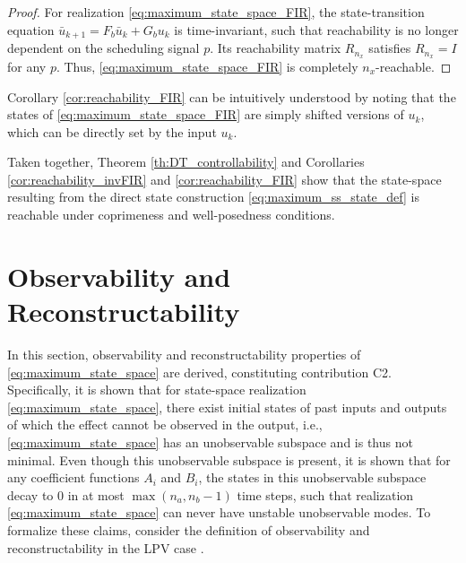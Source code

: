 \begin{proof}
    For realization \eqref{eq:maximum_state_space_FIR}, the state-transition equation $\bar{u}_{k+1} = F_b \bar{u}_k + G_b u_k$ is time-invariant, such that reachability is no longer dependent on the scheduling signal $p$. Its reachability matrix $R_{n_x}$ satisfies $R_{n_x} = I$ for any $p$. Thus, \eqref{eq:maximum_state_space_FIR} is completely $n_x$-reachable.
\end{proof}
Corollary \ref{cor:reachability_FIR} can be intuitively understood by noting that the states of \eqref{eq:maximum_state_space_FIR} are simply shifted versions of $u_k$, which can be directly set by the input $u_k$.  

Taken together, Theorem \ref{th:DT_controllability} and Corollaries \ref{cor:reachability_invFIR} and \ref{cor:reachability_FIR} show that the state-space resulting from the direct state construction \eqref{eq:maximum_ss_state_def} is reachable under coprimeness and well-posedness conditions.

\section{Observability and Reconstructability}\label{sec:observability}
In this section, observability and reconstructability properties of \eqref{eq:maximum_state_space} are  derived, constituting contribution C2. Specifically, it is shown that for state-space realization \eqref{eq:maximum_state_space}, there exist initial states of past inputs and outputs of which the effect cannot be observed in the output, i.e., \eqref{eq:maximum_state_space} has an unobservable subspace and is thus not minimal. Even though this unobservable subspace is present, it is shown that for any coefficient functions $A_i$ and $B_i$, the states in this unobservable subspace decay to 0 in at most $\max(n_a,n_b-1)$ time steps, such that realization \eqref{eq:maximum_state_space} can never have unstable unobservable modes. To formalize these claims, consider the definition of observability and reconstructability in the LPV case \cite{Silverman1967, Gohberg1992, Toth2010}.


